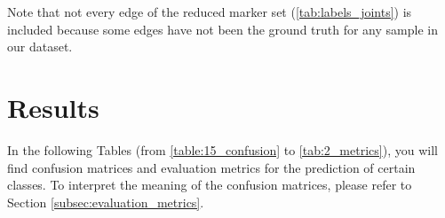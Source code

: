 \begin{figure}[H]
    \begin{minipage}{0.43\linewidth}
        \centering
        \caption{}
        \label{tab:body_division_5}
    \end{minipage}
\end{figure}

Note that not every edge of the reduced marker set (\ref{tab:labels_joints}) is included because some edges have not been the ground truth for any sample in our dataset.

\section{Results}
In the following Tables (from \ref{table:15_confusion} to \ref{tab:2_metrics}), you will find confusion matrices and evaluation metrics for the prediction of certain classes.
To interpret the meaning of the confusion matrices, please refer to Section \ref{subsec:evaluation_metrics}.
\\

